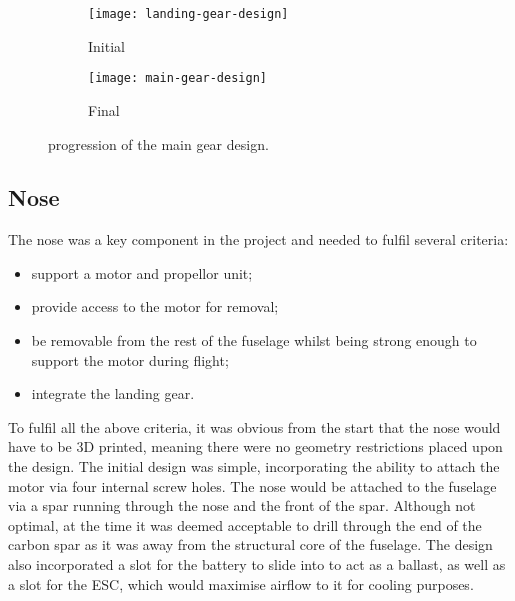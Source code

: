 \documentclass[../../main.tex]{subfiles}
\begin{document}
\begin{figure}[H]
    \centering
    \begin{subfigure}[b]{0.33\columnwidth}
        \centering
        \texttt{[image: landing-gear-design]}
        \caption{Initial}
        \label{fig:main-gear-progression:initial}
    \end{subfigure}
    \hfill
    \begin{subfigure}[b]{0.49\columnwidth}
        \centering
        \texttt{[image: main-gear-design]}
        \caption{Final}
        \label{fig:main-gear-progression:final}
    \end{subfigure}
    
    \caption{progression of the main gear design.}
    \label{fig:main-gear-progression}
\end{figure}


\subsection{Nose} \label{sec:design-process:revised-design:nose}

The nose was a key component in the project and needed to fulfil several criteria:

\begin{itemize}
    \item support a motor and propellor unit;
    \item provide access to the motor for removal;
    \item be removable from the rest of the fuselage whilst being strong enough to support the motor during flight;
    \item integrate the landing gear.
\end{itemize}

To fulfil all the above criteria, it was obvious from the start that the nose would have to be 3D printed, meaning there were no geometry restrictions placed upon the design. 
The initial design was simple, incorporating the ability to attach the motor via four internal screw holes.
The nose would be attached to the fuselage via a spar running through the nose and the front of the spar.
Although not optimal, at the time it was deemed acceptable to drill through the end of the carbon spar as it was away from the structural core of the fuselage.
The design also incorporated a slot for the battery to slide into to act as a ballast, as well as a slot for the ESC, which would maximise airflow to it for cooling purposes.
\end{document}
